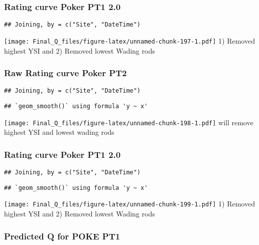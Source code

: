 \documentclass[
]{article}
\begin{document}
\hypertarget{rating-curve-poker-pt1-2.0}{%
\subsubsection{Rating curve Poker PT1
2.0}\label{rating-curve-poker-pt1-2.0}}

\begin{verbatim}
## Joining, by = c("Site", "DateTime")
\end{verbatim}

\texttt{[image: Final\_Q\_files/figure-latex/unnamed-chunk-197-1.pdf]} 1)
Removed highest YSI and 2) Removed lowest Wading rods

\hypertarget{raw-rating-curve-poker-pt2}{%
\subsubsection{Raw Rating curve Poker
PT2}\label{raw-rating-curve-poker-pt2}}

\begin{verbatim}
## Joining, by = c("Site", "DateTime")
\end{verbatim}

\begin{verbatim}
## `geom_smooth()` using formula 'y ~ x'
\end{verbatim}

\texttt{[image: Final\_Q\_files/figure-latex/unnamed-chunk-198-1.pdf]}
will remove highest YSI and lowest wading rods

\hypertarget{rating-curve-poker-pt1-2.0-1}{%
\subsubsection{Rating curve Poker PT1
2.0}\label{rating-curve-poker-pt1-2.0-1}}

\begin{verbatim}
## Joining, by = c("Site", "DateTime")
\end{verbatim}

\begin{verbatim}
## `geom_smooth()` using formula 'y ~ x'
\end{verbatim}

\texttt{[image: Final\_Q\_files/figure-latex/unnamed-chunk-199-1.pdf]} 1)
Removed highest YSI and 2) Removed lowest Wading rods

\hypertarget{predicted-q-for-poke-pt1}{%
\subsubsection{Predicted Q for POKE
PT1}\label{predicted-q-for-poke-pt1}}
\end{document}
